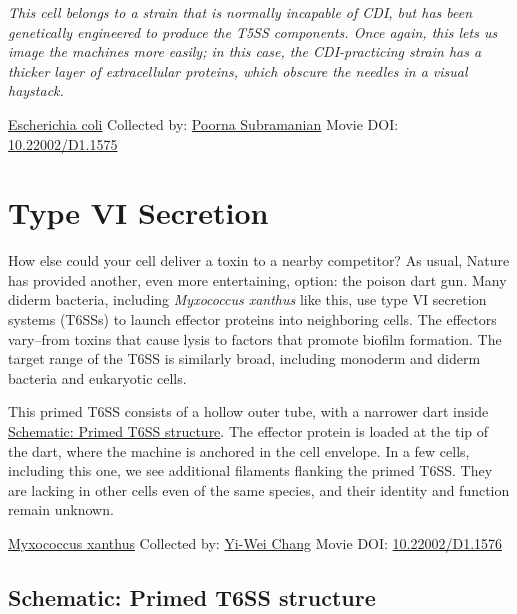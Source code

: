 \documentclass[]{tufte-book}
\begin{document}
\emph{This cell belongs to a strain that is normally incapable of CDI, but has been genetically engineered to produce the T5SS components. Once again, this lets us image the machines more easily; in this case, the CDI-practicing strain has a thicker layer of extracellular proteins, which obscure the needles in a visual haystack.}



\hypertarget{htmlwidget-eb3745ecdbe3c4305097}{}

\label{fig:9-5}\protect\hyperlink{tree}{Escherichia coli} Collected by: \protect\hyperlink{poorna_subramanian}{Poorna Subramanian} Movie DOI: \href{https://doi.org/10.22002/D1.1575}{10.22002/D1.1575}

\hypertarget{type-vi-secretion}{%
\section{Type VI Secretion}\label{type-vi-secretion}}

How else could your cell deliver a toxin to a nearby competitor? As usual, Nature has provided another, even more entertaining, option: the poison dart gun. Many diderm bacteria, including \emph{Myxococcus xanthus} like this, use type VI secretion systems (T6SSs) to launch effector proteins into neighboring cells. The effectors vary--from toxins that cause lysis to factors that promote biofilm formation. The target range of the T6SS is similarly broad, including monoderm and diderm bacteria and eukaryotic cells.

This primed T6SS consists of a hollow outer tube, with a narrower dart inside \protect\hyperlink{Primed_T6SS_structure}{Schematic: Primed T6SS structure}. The effector protein is loaded at the tip of the dart, where the machine is anchored in the cell envelope. In a few cells, including this one, we see additional filaments flanking the primed T6SS. They are lacking in other cells even of the same species, and their identity and function remain unknown.



\hypertarget{htmlwidget-8bf2b3f507ac77d8b39e}{}

\label{fig:9-6}\protect\hyperlink{tree}{Myxococcus xanthus} Collected by: \protect\hyperlink{yi-wei_chang}{Yi-Wei Chang} Movie DOI: \href{https://doi.org/10.22002/D1.1576}{10.22002/D1.1576}

\hypertarget{Primed_T6SS_structure}{%
\subsection*{Schematic: Primed T6SS structure}\label{Primed_T6SS_structure}}
\end{document}
